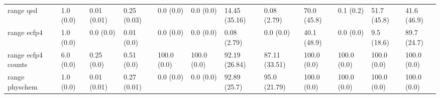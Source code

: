 \begin{tabular}{llllllllllll}
range qed & {\cellcolor[HTML]{F6FCFD}} \color[HTML]{000000} 1.0 (0.0) & {\cellcolor[HTML]{F7FCFD}} \color[HTML]{000000} 0.01 (0.01) & {\cellcolor[HTML]{AFE1D5}} \color[HTML]{000000} 0.25 (0.03) & {\cellcolor[HTML]{F7FCFD}} \color[HTML]{000000} 0.0 (0.0) & {\cellcolor[HTML]{F7FCFD}} \color[HTML]{000000} 0.0 (0.0) & {\cellcolor[HTML]{E1F4F6}} \color[HTML]{000000} 14.45 (35.16) & {\cellcolor[HTML]{F7FCFD}} \color[HTML]{000000} 0.08 (2.79) & {\cellcolor[HTML]{F7FCFD}} \color[HTML]{000000} 70.0 (45.8) & {\cellcolor[HTML]{F4FBFC}} \color[HTML]{000000} 0.1 (0.2) & {\cellcolor[HTML]{C8EBE4}} \color[HTML]{000000} 51.7 (45.8) & {\cellcolor[HTML]{F5FBFC}} \color[HTML]{000000} 41.6 (46.9) \\
range ecfp4 & {\cellcolor[HTML]{F6FCFD}} \color[HTML]{000000} 1.0 (0.0) & {\cellcolor[HTML]{F7FCFD}} \color[HTML]{000000} 0.0 (0.0) & {\cellcolor[HTML]{F6FCFD}} \color[HTML]{000000} 0.01 (0.0) & {\cellcolor[HTML]{F7FCFD}} \color[HTML]{000000} 0.0 (0.0) & {\cellcolor[HTML]{F7FCFD}} \color[HTML]{000000} 0.0 (0.0) & {\cellcolor[HTML]{F7FCFD}} \color[HTML]{000000} 0.08 (2.79) & {\cellcolor[HTML]{F7FCFD}} \color[HTML]{000000} 0.0 (0.0) & {\cellcolor[HTML]{F6FCFD}} \color[HTML]{000000} 40.1 (48.9) & {\cellcolor[HTML]{F5FBFC}} \color[HTML]{000000} 0.0 (0.0) & {\cellcolor[HTML]{00441B}} \color[HTML]{F1F1F1} 9.5 (18.6) & {\cellcolor[HTML]{00441B}} \color[HTML]{F1F1F1} 89.7 (24.7) \\
range ecfp4 counts & {\cellcolor[HTML]{EFF9FB}} \color[HTML]{000000} 6.0 (0.0) & {\cellcolor[HTML]{F6FCFD}} \color[HTML]{000000} 0.25 (0.0) & {\cellcolor[HTML]{62C09F}} \color[HTML]{000000} 0.51 (0.0) & {\cellcolor[HTML]{F7FCFD}} \color[HTML]{000000} 100.0 (0.0) & {\cellcolor[HTML]{F7FCFD}} \color[HTML]{000000} 100.0 (0.0) & {\cellcolor[HTML]{005C25}} \color[HTML]{F1F1F1} 92.19 (26.84) & {\cellcolor[HTML]{006D2C}} \color[HTML]{F1F1F1} 87.11 (33.51) & {\cellcolor[HTML]{3AA66A}} \color[HTML]{F1F1F1} 100.0 (0.0) & {\cellcolor[HTML]{004D1F}} \color[HTML]{F1F1F1} 100.0 (0.0) & {\cellcolor[HTML]{00441B}} \color[HTML]{F1F1F1} 100.0 (0.0) & {\cellcolor[HTML]{00441B}} \color[HTML]{F1F1F1} 100.0 (0.0) \\
range physchem & {\cellcolor[HTML]{F6FCFD}} \color[HTML]{000000} 1.0 (0.0) & {\cellcolor[HTML]{F6FCFD}} \color[HTML]{000000} 0.01 (0.01) & {\cellcolor[HTML]{C2E8E0}} \color[HTML]{000000} 0.27 (0.01) & {\cellcolor[HTML]{F7FCFD}} \color[HTML]{000000} 0.0 (0.0) & {\cellcolor[HTML]{F7FCFD}} \color[HTML]{000000} 0.0 (0.0) & {\cellcolor[HTML]{005B25}} \color[HTML]{F1F1F1} 92.89 (25.7) & {\cellcolor[HTML]{005321}} \color[HTML]{F1F1F1} 95.0 (21.79) & {\cellcolor[HTML]{00441B}} \color[HTML]{F1F1F1} 100.0 (0.0) & {\cellcolor[HTML]{00441B}} \color[HTML]{F1F1F1} 100.0 (0.0) & {\cellcolor[HTML]{72C7AD}} \color[HTML]{000000} 100.0 (0.0) & {\cellcolor[HTML]{8FD4C2}} \color[HTML]{000000} 100.0 (0.0) \\

\end{tabular}

